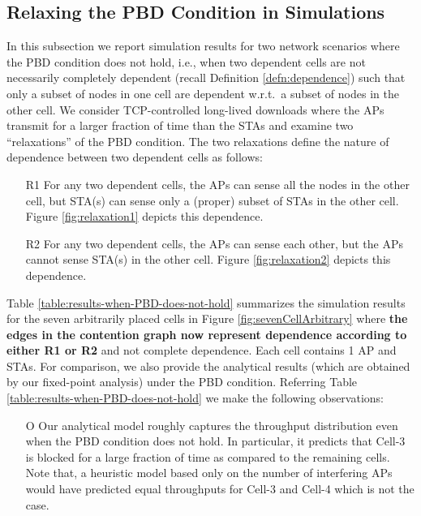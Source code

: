 \documentclass[10pt,a4paper,journal]{IEEEtran}
\theoremstyle{definition}
\theoremstyle{remark}
\theoremstyle{plain}
\begin{document}
\subsection{Relaxing the PBD Condition in Simulations}
\label{subsec:when-PBD-does-not-hold}



In this subsection we report simulation results for two network scenarios where the PBD condition does not hold, i.e., when two dependent cells are not necessarily completely dependent (recall Definition \ref{defn:dependence}) such that only a subset of nodes in one cell are dependent w.r.t.~a subset of nodes in the other cell. We consider TCP-controlled long-lived downloads where the APs transmit for a larger fraction of time than the STAs and examine two ``relaxations'' of the PBD condition. The two relaxations define the nature of dependence between two dependent cells as follows:


\begin{itemize}

\item [R1] For any two dependent cells, the APs can sense all the nodes in the other cell, but  STA(s) can sense only a (proper) subset of STAs in the other cell. Figure \ref{fig:relaxation1} depicts this dependence.

\item [R2] For any two dependent cells, the APs can sense each other, but the APs cannot sense  STA(s) in the other cell. Figure \ref{fig:relaxation2} depicts this dependence.

\end{itemize}


Table \ref{table:results-when-PBD-does-not-hold} summarizes the simulation results for the seven arbitrarily placed cells in Figure \ref{fig:sevenCellArbitrary} where \textbf{the edges in the contention graph now represent dependence according to either R1 or R2} and not complete dependence. Each cell contains 1 AP and  STAs. For comparison, we also provide the analytical results (which are obtained by our fixed-point analysis) under the PBD condition. Referring Table \ref{table:results-when-PBD-does-not-hold} we make the following observations:
\begin{itemize}

\item [O] Our analytical model roughly captures the throughput
  distribution even when the PBD condition does not hold.  In
  particular, it predicts that Cell-3 is blocked for a large fraction
  of time as compared to the remaining cells.  Note that, a heuristic
  model based only on the number of interfering APs would have
  predicted equal throughputs for Cell-3 and Cell-4 which is not the
  case.
\end{itemize}
\end{document}
